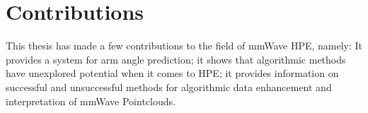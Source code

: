 \section{Contributions}
\label{section: introduction - contributions}

This thesis has made a few contributions to the field of mmWave HPE, namely:
It provides a system for arm angle prediction; it shows that algorithmic methods have unexplored potential when it comes to HPE; it provides information on successful and unsuccessful methods for algorithmic data enhancement and interpretation of mmWave Pointclouds.